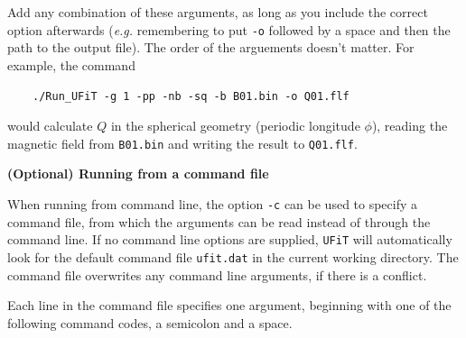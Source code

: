 \documentclass[12pt,twoside]{article}
\begin{document}
\begin{tabular}{|c|l|}
\end{tabular}

\vspace{2mm}

Add any combination of these arguments, as long as you include the correct option afterwards (\textit{e.g.} remembering to put \texttt{-o} followed by a space and then the path to the output file). The order of the arguements doesn't matter. For example, the command

$\quad\quad$\texttt{./Run\_UFiT -g 1 -pp -nb -sq -b B01.bin -o Q01.flf}

would calculate $Q$ in the spherical geometry (periodic longitude $\phi$), reading the magnetic field from \texttt{B01.bin} and writing the result to \texttt{Q01.flf}.


\vspace{2mm}
{\Large \textbf{(Optional) Running from a command file}}

When running from command line, the option \texttt{-c} can be used to specify a command file, from which the arguments can be read instead of through the command line. If no command line options are supplied, \texttt{UFiT} will automatically look for the default command file \texttt{ufit.dat} in the current working directory. The command file overwrites any command line arguments, if there is a conflict.

Each line in the command file specifies one argument, beginning with one of the following command codes, a semicolon and a space.
\end{document}
